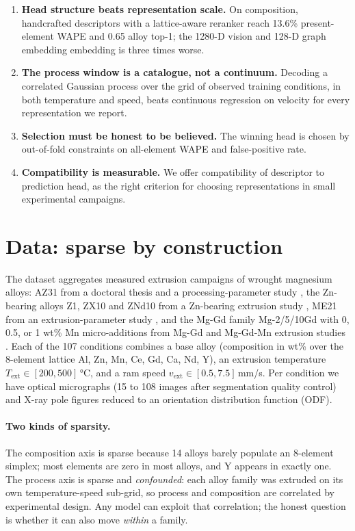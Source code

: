 \documentclass{article}
\newcommand{\Text}{T_{\mathrm{ext}}}
\newcommand{\vext}{v_{\mathrm{ext}}}
\begin{document}
\begin{enumerate}[leftmargin=1.4em,itemsep=1pt]
  \item \textbf{Head structure beats representation scale.} On composition,
  handcrafted descriptors with a lattice-aware reranker reach 13.6\%
  present-element WAPE and 0.65 alloy top-1; the 1280-D vision and 128-D graph embedding
  embedding is three times worse.
  \item \textbf{The process window is a catalogue, not a continuum.} Decoding
  a correlated Gaussian process over the grid of observed training conditions,
  in both temperature and speed, beats continuous regression on velocity for
  every representation we report.
  \item \textbf{Selection must be honest to be believed.} The winning head is
  chosen by out-of-fold constraints on all-element WAPE and false-positive
  rate.
  \item \textbf{Compatibility is measurable.} We offer
  compatibility of descriptor to prediction head, as the right criterion for
  choosing representations in small experimental campaigns.
\end{enumerate}

\section{Data: sparse by construction}
\label{sec:data}

The dataset aggregates measured extrusion campaigns
of wrought magnesium alloys: AZ31 from a doctoral thesis
\cite{nienaber_einfluss_der_2023} and a processing-parameter study
\cite{Nienaber2019}, the Zn-bearing alloys Z1, ZX10 and ZNd10 from a Zn-bearing
extrusion study \cite{CANOCASTILLO2020139527,Nienaber2019}, ME21 from an
extrusion-parameter study \cite{KurzG}, and the Mg-Gd family Mg-2/5/10Gd with
0, 0.5, or 1 wt\% Mn micro-additions from Mg-Gd and Mg-Gd-Mn extrusion studies
\cite{Harmuth,cryst12081036}. Each of the 107 conditions combines a base alloy (composition
in wt\% over the 8-element lattice Al, Zn, Mn, Ce, Gd, Ca, Nd, Y), an extrusion
temperature $\Text \in [200, 500]$\,°C, and a ram speed $\vext \in [0.5,
7.5]$\,mm/s. Per condition we have optical micrographs (15 to 108 images after
segmentation quality control) and X-ray pole figures reduced to an orientation
distribution function (ODF).

\paragraph{Two kinds of sparsity.} The composition axis is sparse because 14
alloys barely populate an 8-element simplex; most elements are zero in most
alloys, and Y appears in exactly one. The process axis is sparse and
\emph{confounded}: each alloy family was extruded on its own temperature-speed
sub-grid, so process and composition are correlated by experimental design.
Any model can exploit that correlation; the honest question is whether it can
also move \emph{within} a family.
\end{document}
